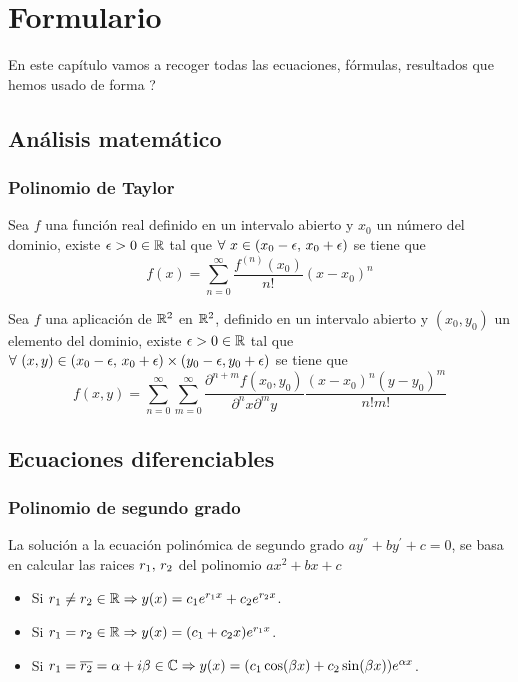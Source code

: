 \chapter{Formulario}\label{ch:formulario}
En este capítulo vamos a recoger todas las ecuaciones, fórmulas, resultados que hemos usado de forma ?

\section{Análisis matemático}\label{sec:analisis-matematico}

\subsection{Polinomio de Taylor}\label{subsec:polinomio-de-taylor}
Sea $f$ una función real definido en un intervalo abierto y $x_0$ un número del dominio, existe $\epsilon>0\in\mathbb{R}$ tal que $\forall\ x\in(x_0-\epsilon,\thinspace x_0+\epsilon)$ se tiene que
\begin{equation}
    \label{eq:polinomio-taylor}
    f(x)=\sum_{n=0}^{\infty} \frac{f^{(n)}(x_0)}{n !}(x-x_0)^n
\end{equation}

Sea $f$ una aplicación de $\mathbb{R}^2$ en $\mathbb{R}^2$, definido en un intervalo abierto y $(x_0, y_0)$ un elemento del dominio, existe $\epsilon > 0 \in\mathbb{R}$ tal que $\forall\ (x, y)\in(x_0-\epsilon,\thinspace x_0+\epsilon)\times(y_0-\epsilon, y_0+\epsilon)$ se tiene que
\begin{equation}
    \label{eq:polinomio-taylor-dos-variables}
    f(x,y)=\sum_{n=0}^{\infty} \sum_{m=0}^{\infty} \frac{\partial^{n+m}f(x_0, y_0)}{\partial^n x\partial^m y}\frac{(x-x_0)^n(y-y_0)^m}{n!m!}
\end{equation}

\section{Ecuaciones diferenciables}\label{sec:ecuaciones-diferenciables}
\subsection{Polinomio de segundo grado}\label{subsec:polinomio-de-segundo-grado}
La solución a la ecuación polinómica de segundo grado $ay^{''}+by^{'}+c=0$, se basa en calcular las raices $r_1,\thinspace r_2$ del polinomio
$ax^2+bx+c$
\begin{itemize}
    \item Si $r_1\neq r_2\in\mathbb{R}\Rightarrow y(x)=c_{1}e^{r_{1}x}+c_{2}e^{r_{2}x}$.
    \item Si $r_1= r_2\in\mathbb{R}\Rightarrow y(x)=(c_{1}+c_{2}x)e^{r_{1}x}$.
    \item Si $r_1= \overline{r_2}=\alpha+i\beta\in\mathbb{C}\Rightarrow y(x)=(c_{1}\cos(\beta x)+c_{2}\sin(\beta x))e^{\alpha x}$.
\end{itemize}

